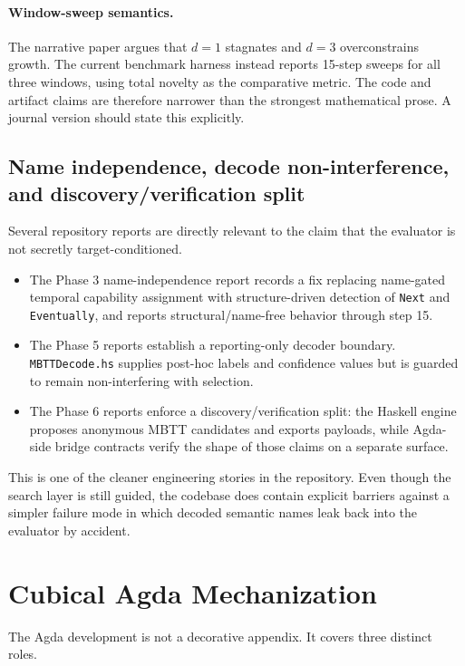 \documentclass[11pt,a4paper]{article}
\begin{document}
\paragraph{Window-sweep semantics.}
The narrative paper argues that $d=1$ stagnates and $d=3$ overconstrains growth. The current benchmark harness instead reports 15-step sweeps for all three windows, using total novelty as the comparative metric. The code and artifact claims are therefore narrower than the strongest mathematical prose. A journal version should state this explicitly.

\subsection{Name independence, decode non-interference, and discovery/verification split}

Several repository reports are directly relevant to the claim that the evaluator is not secretly target-conditioned.

\begin{itemize}[nosep]
  \item The Phase 3 name-independence report records a fix replacing name-gated temporal capability assignment with structure-driven detection of \texttt{Next} and \texttt{Eventually}, and reports structural/name-free behavior through step 15.
  \item The Phase 5 reports establish a reporting-only decoder boundary. \texttt{MBTTDecode.hs} supplies post-hoc labels and confidence values but is guarded to remain non-interfering with selection.
  \item The Phase 6 reports enforce a discovery/verification split: the Haskell engine proposes anonymous MBTT candidates and exports payloads, while Agda-side bridge contracts verify the shape of those claims on a separate surface.
\end{itemize}

This is one of the cleaner engineering stories in the repository. Even though the search layer is still guided, the codebase does contain explicit barriers against a simpler failure mode in which decoded semantic names leak back into the evaluator by accident.

\section{Cubical Agda Mechanization}
\label{sec:agda}

The Agda development is not a decorative appendix. It covers three distinct roles.
\end{document}
